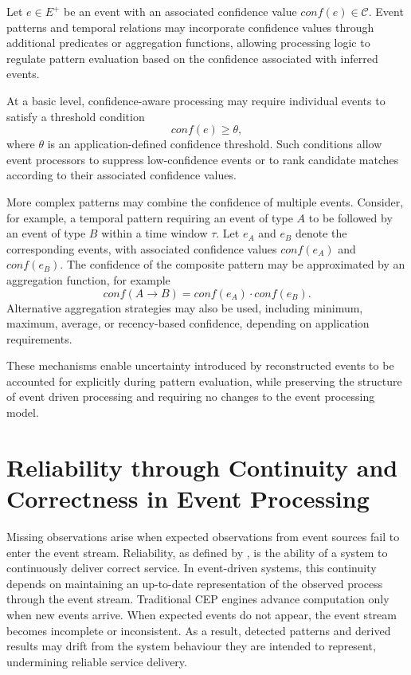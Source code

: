 Let $e \in E^{+}$ be an event with an associated confidence value $conf(e) \in \mathcal{C}$. Event patterns and temporal relations may incorporate confidence values through additional predicates or aggregation functions, allowing processing logic to regulate pattern evaluation based on the confidence associated with inferred events.

At a basic level, confidence-aware processing may require individual events to satisfy a threshold condition
\begin{equation}
conf(e) \ge \theta ,
\end{equation}
\noindent
where $\theta$ is an application-defined confidence threshold. Such conditions allow event processors to suppress low-confidence events or to rank candidate matches according to their associated confidence values.

More complex patterns may combine the confidence of multiple events. Consider, for example, a temporal pattern requiring an event of type $A$ to be followed by an event of type $B$ within a time window $\tau$. Let $e_A$ and $e_B$ denote the corresponding events, with associated confidence values $conf(e_A)$ and $conf(e_B)$. The confidence of the composite pattern may be approximated by an aggregation function, for example
\begin{equation}
conf(A \rightarrow B) = conf(e_A) \cdot conf(e_B).
\end{equation}
Alternative aggregation strategies may also be used, including minimum, maximum, average, or recency-based confidence, depending on application requirements.

These mechanisms enable uncertainty introduced by reconstructed events to be accounted for explicitly during pattern evaluation, while preserving the structure of event driven processing and requiring no changes to the event processing model. 


\section{Reliability through Continuity and Correctness in Event Processing}\label{sec:reliability-implications}
Missing observations arise when expected observations from event sources fail to enter the event stream. Reliability, as defined by \citet{avizienis2004basic}, is the ability of a system to continuously deliver correct service. In event-driven systems, this continuity depends on maintaining an up-to-date representation of the observed process through the event stream. Traditional CEP engines advance computation only when new events arrive. When expected events do not appear, the event stream becomes incomplete or inconsistent. As a result, detected patterns and derived results may drift from the system behaviour they are intended to represent, undermining reliable service delivery.

